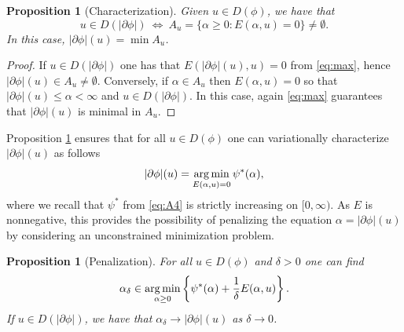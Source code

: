 \documentclass[10pt,a4paper]{amsart}
\DeclareMathOperator*{\argmin}{{\rm arg\,min}}
\renewcommand{\sl}{|\partial \phi|}
\newtheorem{proposition}[theorem]{Proposition}
\begin{document}
 \begin{proposition}[Characterization]\label{prop:char}
  Given $u\in D(\phi)$, we have that
   $$u \in D(\sl) \ \Leftrightarrow  \  A_u =\{ \alpha \geq 0 : 
   E( \alpha,u) =0\} \not = \emptyset.$$
In this case, $\sl(u)=\min  A_u $. 
 \end{proposition}
 \begin{proof}
   If $u \in D(\sl)$ one has that $ E(\sl(u),u)=0$ from
   \eqref{eq:max}, hence $\sl(u) \in  A_u \not =\emptyset$.  Conversely,   if
   $ \alpha  \in  A_u $ then $ E( \alpha,u)=0$ so that $\sl (u)\leq
   \alpha<\infty$ and $u \in D(\sl)$. In
   this case, again \eqref{eq:max} guarantees that $\sl(u)$ is minimal
   in $ A_u $. 
 \end{proof}
 


 Proposition \ref{prop:char} ensures that for all $u \in D(\phi)$ one can variationally
 characterize $\sl(u)$ as follows
 \begin{equation}\sl(u)  = \argmin_{ E(
   \alpha,u)=0}   \psi^*( \alpha) ,\label{eq:strong}
 \end{equation}
 where we recall that $\psi^*$ from \eqref{eq:A4} is strictly
 increasing on $[0,\infty)$. As $ E$ is nonnegative, this provides the possibility of penalizing the equation
 $\alpha=\sl(u)$ by considering an unconstrained minimization problem.

 \begin{proposition}[Penalization]\label{prop:pen}
     For all $u \in D(\phi)$ and $\delta >0$
   one can find
   \begin{equation}\label{eq:min}
     \alpha_\delta \in \argmin_{\alpha\geq 0}  \left\{\psi^*( \alpha) + \frac1\delta  E(
     \alpha,u) \right\}.
   \end{equation}
   If $u \in D(\sl)$,  we have that $\alpha_\delta \to \sl(u)$ as
   $\delta \to 0$. 
 \end{proposition}
\end{document}
